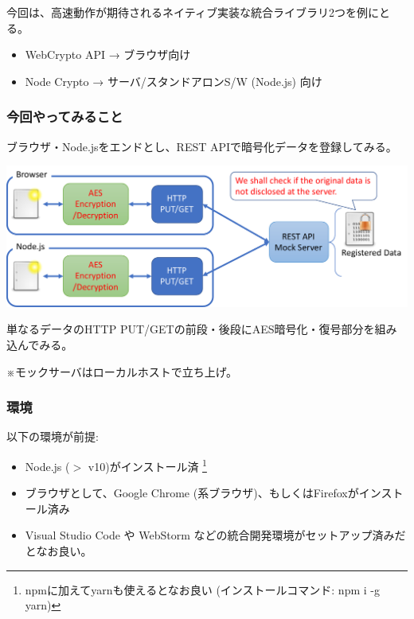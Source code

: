\documentclass[12pt,dvipdfmx]{beamer}
\begin{document}
\begin{frame}
今回は、高速動作が期待されるネイティブ実装な統合ライブラリ2つを例にとる。
\begin{itemize}
 \item WebCrypto API → ブラウザ向け
 \item Node Crypto → サーバ/スタンドアロンS/W (Node.js) 向け
\end{itemize}
\end{frame}

\begin{frame}
\frametitle{今回やってみること}
ブラウザ・Node.jsをエンドとし、REST APIで暗号化データを登録してみる。
\begin{center}
\includegraphics[width=\linewidth]{Figs/mock_flow.pdf}
\end{center}
単なるデータのHTTP PUT/GETの前段・後段にAES暗号化・復号部分を組み込んでみる。

※モックサーバはローカルホストで立ち上げ。
\end{frame}

\begin{frame}
\frametitle{環境}
以下の環境が前提:
\begin{itemize}
 \item Node.js ($>$ v10)がインストール済 \footnote[frame]{npmに加えてyarnも使えるとなお良い (インストールコマンド: npm i -g yarn)}
 \item ブラウザとして、Google Chrome (系ブラウザ)、もしくはFirefoxがインストール済み
 \item Visual Studio Code や WebStorm などの統合開発環境がセットアップ済みだとなお良い。
\end{itemize}
\end{frame}
\end{document}
